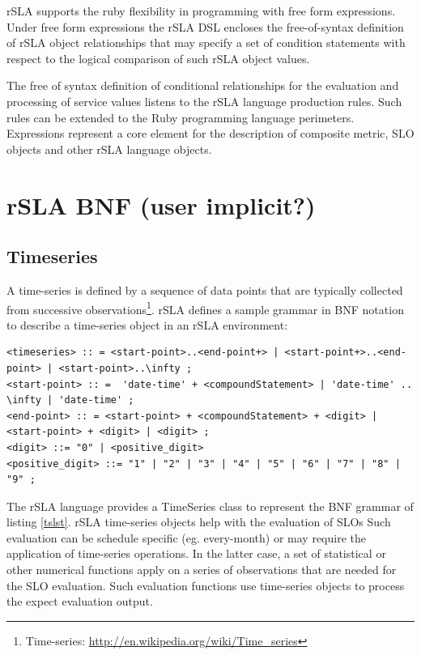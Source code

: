 \documentclass{llncs}
\begin{document}
rSLA supports the ruby flexibility in programming with free form expressions. Under free form expressions the rSLA DSL encloses the free-of-syntax definition of rSLA object relationships that may specify a set of condition statements with respect to the logical comparison of such rSLA object values. 

The free of syntax definition of conditional relationships for the evaluation and processing of service values listens to the rSLA language production rules. Such rules can be extended to the Ruby programming language perimeters. Expressions represent a core element for the description of composite metric, SLO objects and other rSLA language objects.


\section{rSLA BNF (user implicit?)}

\subsection{Timeseries}\label{timeseries}

A time-series is defined by a sequence of data points that are typically collected from successive observations\footnote{Time-series: \url{http://en.wikipedia.org/wiki/Time_series}}. rSLA defines a sample grammar in BNF notation to describe a time-series object in an rSLA environment:
\begin{lstlisting}[breaklines, firstnumber=auto, caption=$<timeSeries>$ BNF grammar, label=tslst]
<timeseries> :: = <start-point>..<end-point+> | <start-point+>..<end-point> | <start-point>..\infty ;
<start-point> :: =  'date-time' + <compoundStatement> | 'date-time' .. \infty | 'date-time' ;
<end-point> :: = <start-point> + <compoundStatement> + <digit> | <start-point> + <digit> | <digit> ;
<digit> ::= "0" | <positive_digit>
<positive_digit> ::= "1" | "2" | "3" | "4" | "5" | "6" | "7" | "8" | "9" ;
\end{lstlisting}

The rSLA language provides a TimeSeries class to represent the BNF grammar of listing \ref{tslst}. rSLA time-series objects help with the evaluation of SLOs Such evaluation can be schedule specific (eg. every-month) or may require the application of time-series operations. In the latter case, a set of statistical or other numerical functions apply on a series of observations that are needed for the SLO evaluation. Such evaluation functions use time-series objects to process the expect evaluation output.
\end{document}
